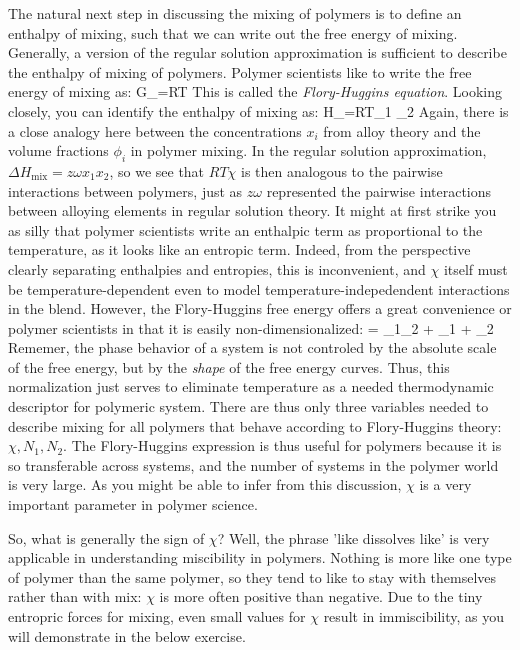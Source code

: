 \documentclass[12pt]{article}
\begin{document}
The natural next step in discussing the mixing of polymers is to define an enthalpy of mixing, such that we can write out the free energy of mixing. Generally, a version of the regular solution approximation is sufficient to describe the enthalpy of mixing of polymers. Polymer scientists like to write the free energy of mixing as:
\eqs
\Delta G_=RT 
\eqe
This is called the \emph{Flory-Huggins equation}. Looking closely, you can identify the enthalpy of mixing as:
\eqs
\Delta H_=RT\chi \phi_1 \phi_2
\eqe
Again, there is a close analogy here between the concentrations $x_i$ from alloy theory and the volume fractions $\phi_i$ in polymer mixing. In the regular solution approximation, $\Delta H_\text{mix}=z\omega x_1 x_2$, so we see that $RT\chi$ is then analogous to the pairwise interactions between polymers, just as $z\omega$ represented the pairwise interactions between alloying elements in regular solution theory. It might at first strike you as silly that polymer scientists write an enthalpic term as proportional to the temperature, as it looks like an entropic term. Indeed, from the perspective clearly separating enthalpies and entropies, this is inconvenient, and $\chi$ itself must be temperature-dependent even to model temperature-indepedendent interactions in the blend. However, the Flory-Huggins free energy offers a great convenience or polymer scientists in that it is easily non-dimensionalized:
\eqs
{}= \chi \phi_1\phi_2 +  \ln \phi_1 +   \ln \phi_2 
\eqe
Rememer, the phase behavior of a system is not controled by the absolute scale of the free energy, but by the \emph{shape} of the free energy curves. Thus, this normalization just serves to eliminate temperature as a needed thermodynamic descriptor for polymeric system. There are thus only three variables needed to describe mixing for all polymers that behave according to Flory-Huggins theory: $\chi, N_1,N_2$. The Flory-Huggins expression is thus useful for polymers because it is so transferable across systems, and the number of systems in the polymer world is very large. As you might be able to infer from this discussion, $\chi$ is a very important parameter in polymer science.

So, what is generally the sign of $\chi$? Well, the phrase 'like dissolves like' is very applicable in understanding miscibility in polymers. Nothing is more like one type of polymer than the same polymer, so they tend to like to stay with themselves rather than with mix: $\chi$ is more often positive than negative. Due to the tiny entropric forces for mixing, even small values for $\chi$ result in immiscibility, as you will demonstrate in the below exercise.
\end{document}
